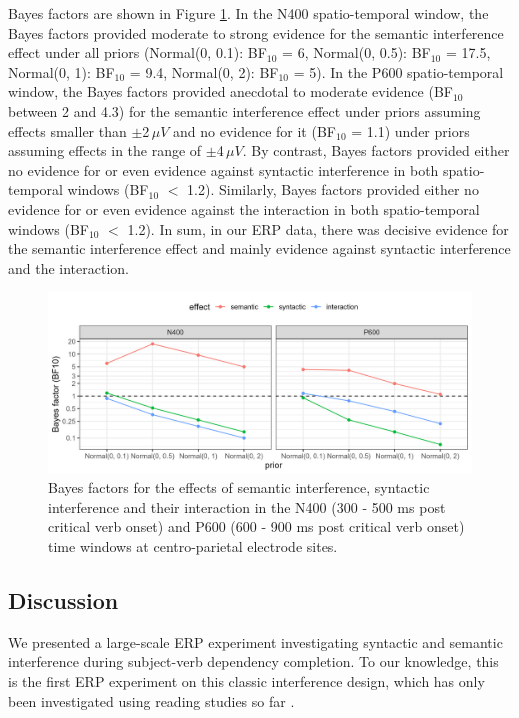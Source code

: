 \documentclass[review,preprint,12pt,authoryear,floatsintext]{elsarticle}
\begin{document}
Bayes factors are shown in Figure \ref{fig:eeg_bfs}. {In the N400 spatio-temporal window, the Bayes factors provided moderate to strong evidence for the semantic interference effect under all priors 
(Normal(0, 0.1): BF$_{10}$ = 6,
Normal(0, 0.5): BF$_{10}$ = 17.5,
Normal(0, 1): BF$_{10}$ = 9.4,
Normal(0, 2): BF$_{10}$ = 5). In the P600 spatio-temporal window, the Bayes factors provided anecdotal to moderate evidence (BF$_{10}$ between 2 and 4.3) for the semantic interference effect under priors assuming effects smaller than $\pm$2\,$\mu V$ and no evidence for it (BF$_{10}$ = 1.1) under priors assuming effects in the range of $\pm$4\,$\mu V$. By contrast, Bayes factors provided either no evidence for or even evidence against syntactic interference in both spatio-temporal windows (BF$_{10}$ $<$ 1.2). Similarly, Bayes factors provided either no evidence for or even evidence against the interaction in both spatio-temporal windows (BF$_{10}$ $<$ 1.2). In sum, in our ERP data, there was decisive evidence for the semantic interference effect and mainly evidence against syntactic interference and the interaction.}\label{ERP_results3}

{
\begin{figure}[h]
    \caption{Bayes factors for the effects of semantic interference, syntactic interference and their interaction in the N400 (300 - 500 ms post critical verb onset) and P600 (600 - 900 ms post critical verb onset) time windows at centro-parietal electrode sites.}\label{fig:eeg_bfs}
    \centering
    \includegraphics[width=1\textwidth]{BF_plot_eeg.jpg}
\end{figure} }



\subsection{Discussion}
We presented a large-scale ERP experiment investigating syntactic and semantic interference during subject-verb dependency completion. To our knowledge, this is the first ERP experiment on this classic interference design, which has only been investigated using reading studies so far \citep{mertzen,vandyke07}. 
\end{document}
